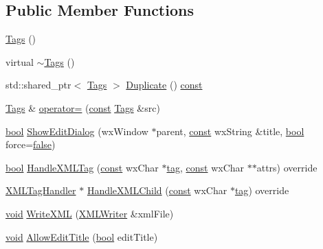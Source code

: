 \subsection*{Public Member Functions}
\begin{DoxyCompactItemize}
\item 
\hyperlink{class_tags_a8d3045112662e0ace4b8bafb5a3e8f57}{Tags} ()
\item 
virtual \hyperlink{class_tags_a8fbc021de7f063e0a8f0dc79a8894083}{$\sim$\+Tags} ()
\item 
std\+::shared\+\_\+ptr$<$ \hyperlink{class_tags}{Tags} $>$ \hyperlink{class_tags_ac08cde7c82555e2ab20585a8435b2c1c}{Duplicate} () \hyperlink{getopt1_8c_a2c212835823e3c54a8ab6d95c652660e}{const} 
\item 
\hyperlink{class_tags}{Tags} \& \hyperlink{class_tags_abf28ae7d1eccf72f5654012f22546c81}{operator=} (\hyperlink{getopt1_8c_a2c212835823e3c54a8ab6d95c652660e}{const} \hyperlink{class_tags}{Tags} \&src)
\item 
\hyperlink{mac_2config_2i386_2lib-src_2libsoxr_2soxr-config_8h_abb452686968e48b67397da5f97445f5b}{bool} \hyperlink{class_tags_a257b16b935830009da72300d934b8db3}{Show\+Edit\+Dialog} (wx\+Window $\ast$parent, \hyperlink{getopt1_8c_a2c212835823e3c54a8ab6d95c652660e}{const} wx\+String \&title, \hyperlink{mac_2config_2i386_2lib-src_2libsoxr_2soxr-config_8h_abb452686968e48b67397da5f97445f5b}{bool} force=\hyperlink{mac_2config_2i386_2lib-src_2libsoxr_2soxr-config_8h_a65e9886d74aaee76545e83dd09011727}{false})
\item 
\hyperlink{mac_2config_2i386_2lib-src_2libsoxr_2soxr-config_8h_abb452686968e48b67397da5f97445f5b}{bool} \hyperlink{class_tags_a89a4f263b11d46140f41bdd7ef171a75}{Handle\+X\+M\+L\+Tag} (\hyperlink{getopt1_8c_a2c212835823e3c54a8ab6d95c652660e}{const} wx\+Char $\ast$\hyperlink{structtag}{tag}, \hyperlink{getopt1_8c_a2c212835823e3c54a8ab6d95c652660e}{const} wx\+Char $\ast$$\ast$attrs) override
\item 
\hyperlink{class_x_m_l_tag_handler}{X\+M\+L\+Tag\+Handler} $\ast$ \hyperlink{class_tags_ade3552b01c74f0e2c6c992e937940b5f}{Handle\+X\+M\+L\+Child} (\hyperlink{getopt1_8c_a2c212835823e3c54a8ab6d95c652660e}{const} wx\+Char $\ast$\hyperlink{structtag}{tag}) override
\item 
\hyperlink{sound_8c_ae35f5844602719cf66324f4de2a658b3}{void} \hyperlink{class_tags_a38cafa1d608459025f829b743ebd807f}{Write\+X\+ML} (\hyperlink{class_x_m_l_writer}{X\+M\+L\+Writer} \&xml\+File)
\item 
\hyperlink{sound_8c_ae35f5844602719cf66324f4de2a658b3}{void} \hyperlink{class_tags_ab24e601a4a1b27156962bad7b0579241}{Allow\+Edit\+Title} (\hyperlink{mac_2config_2i386_2lib-src_2libsoxr_2soxr-config_8h_abb452686968e48b67397da5f97445f5b}{bool} edit\+Title)
$$
\end{DoxyCompactItemize}
